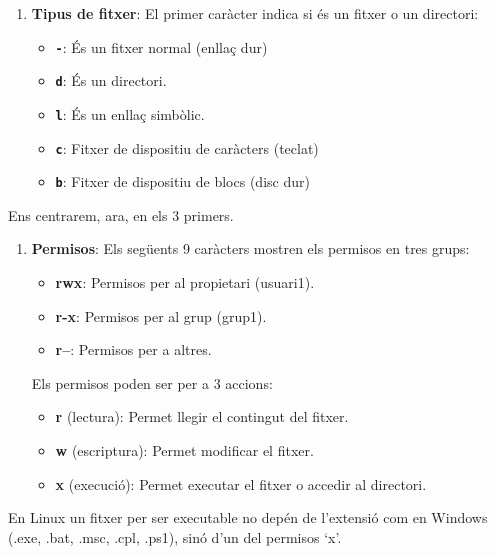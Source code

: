 \documentclass[
  a4paper,
]{article}
\providecommand{\tightlist}{%
  \setlength{\itemsep}{0pt}\setlength{\parskip}{0pt}}
\begin{document}
\begin{enumerate}
\def\labelenumi{\arabic{enumi}.}
\tightlist
\item
  \textbf{Tipus de fitxer}: El primer caràcter indica si és un fitxer o
  un directori:

  \begin{itemize}
  \tightlist
  \item
    \textbf{\texttt{-}}: És un fitxer normal (enllaç dur)
  \item
    \textbf{\texttt{d}}: És un directori.
  \item
    \textbf{\texttt{l}}: És un enllaç simbòlic.
  \item
    \textbf{\texttt{c}}: Fitxer de dispositiu de caràcters (teclat)
  \item
    \textbf{\texttt{b}}: Fitxer de dispositiu de blocs (disc dur)
  \end{itemize}
\end{enumerate}

Ens centrarem, ara, en els 3 primers.

\begin{enumerate}
\def\labelenumi{\arabic{enumi}.}
\setcounter{enumi}{1}
\tightlist
\item
  \textbf{Permisos}: Els següents 9 caràcters mostren els permisos en
  tres grups:

  \begin{itemize}
  \tightlist
  \item
    \textbf{rwx}: Permisos per al propietari (usuari1).
  \item
    \textbf{r-x}: Permisos per al grup (grup1).
  \item
    \textbf{r--}: Permisos per a altres.
  \end{itemize}

  Els permisos poden ser per a 3 accions:

  \begin{itemize}
  \tightlist
  \item
    \textbf{r} (lectura): Permet llegir el contingut del fitxer.
  \item
    \textbf{w} (escriptura): Permet modificar el fitxer.
  \item
    \textbf{x} (execució): Permet executar el fitxer o accedir al
    directori.
  \end{itemize}
\end{enumerate}

En Linux un fitxer per ser executable no depén de l'extensió com en
Windows (.exe, .bat, .msc, .cpl, .ps1), sinó d'un del permisos `x'.
\end{document}
